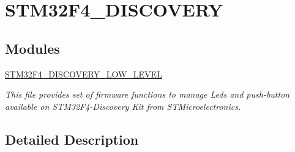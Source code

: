 \hypertarget{group___s_t_m32_f4___d_i_s_c_o_v_e_r_y}{}\section{S\+T\+M32\+F4\+\_\+\+D\+I\+S\+C\+O\+V\+E\+R\+Y}
\label{group___s_t_m32_f4___d_i_s_c_o_v_e_r_y}
\subsection*{Modules}
\begin{DoxyCompactItemize}
\item 
\hyperlink{group___s_t_m32_f4___d_i_s_c_o_v_e_r_y___l_o_w___l_e_v_e_l}{S\+T\+M32\+F4\+\_\+\+D\+I\+S\+C\+O\+V\+E\+R\+Y\+\_\+\+L\+O\+W\+\_\+\+L\+E\+V\+E\+L}
\begin{DoxyCompactList}\small\item\em This file provides set of firmware functions to manage Leds and push-\/button available on S\+T\+M32\+F4-\/\+Discovery Kit from S\+T\+Microelectronics. \end{DoxyCompactList}\end{DoxyCompactItemize}


\subsection{Detailed Description}
